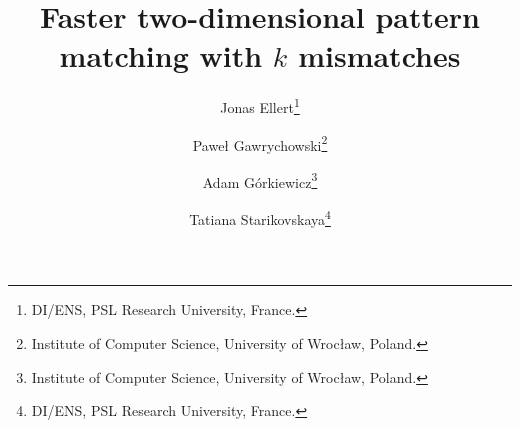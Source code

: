 \documentclass[twoside,leqno]{article}
\begin{document}
\title{\Large Faster two-dimensional pattern matching with $k$ mismatches}
%

\author{Jonas Ellert\thanks{DI/ENS, PSL Research University, France.}
\and Paweł Gawrychowski\thanks{Institute of Computer Science, University of Wrocław, Poland.}
\and Adam Górkiewicz\thanks{Institute of Computer Science, University of Wrocław, Poland.}
\and Tatiana Starikovskaya\thanks{DI/ENS, PSL Research University, France.}
}

\date{}

\maketitle








\date{}
\maketitle
\end{document}
